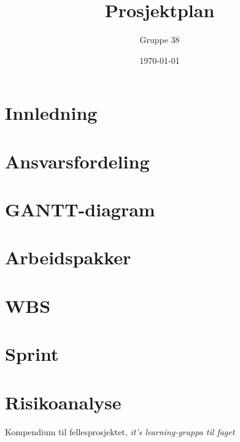 \documentclass[titlepage]{article}
\author{Gruppe 38}
\title{Prosjektplan}
\date{\today}
\begin{document}
\maketitle

\begin{abstract}

\end{abstract}

\tableofcontents


\newpage
\section{Innledning}


\newpage
\section{Ansvarsfordeling}


\newpage
\section{GANTT-diagram}


\newpage
\section{Arbeidspakker}


\newpage
\section{WBS}


\newpage
\section{Sprint}


\newpage
\section{Risikoanalyse}


\newpage
\listoftables

\newpage
\listoffigures

\newpage
\begin{thebibliography}{9}

	Kompendium til fellesprosjektet,
	\emph{it's learning-gruppa til faget}
\end{thebibliography}
\end{document}
